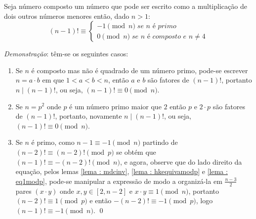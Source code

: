 \begin{teorema} \label{teorema : wilson}
    Seja número composto um número que pode ser escrito como a multiplicação de dois outros números menores então, dado $n > 1$:
    \begin{equation*}
        (n - 1)! \equiv \begin{cases}
                        -1 \pmod{n} \; \textit{se $n$ é primo} \\
                        0 \pmod{n} \; \textit{se $n$ é composto e $n \neq 4$}
                        \end{cases}
    \end{equation*}
\end{teorema}
\noindent
\textit{Demonstração}: têm-se os seguintes casos:
\begin{enumerate}
    \item Se $n$ é composto mas não é quadrado de um número primo, pode-se escrever $n = a \cdot b$ em que $1 < a < b < n$, então $a$ e $b$ são fatores de $(n-1)!$, portanto $n \mid (n-1)!$, ou seja, $(n-1)! \equiv 0 \pmod{n}$.

    \item Se $n = p^2$ onde $p$ é um número primo maior que $2$ então $p$ e $2 \cdot p$ são fatores de $(n-1)!$, portanto, novamente $n \mid (n-1)!$, ou seja, $(n-1)! \equiv 0 \pmod{n}$.

    \item \label{item:caso3wilson} Se $n$ é primo, como $n - 1 \equiv -1 \pmod{n}$ partindo de $(n-2)! \equiv (n-2)! \pmod{p}$ se obtém que $(n-1)! \equiv -(n-2)! \pmod{n}$, e agora, observe que do lado direito da equação, pelos lemas \ref{lema : mdcinv}, \ref{lema : hkequivamodp} e \ref{lema : eq1modp}, pode-se manipular a expressão de modo a organizá-la em $\frac{n-3}{2}$ pares $(x \cdot y)$ onde $x, y \in [2, n-2]$ e                      $x \cdot y \equiv 1 \pmod{n}$, portanto $(n-2)! \equiv 1 \pmod{p}$ e então $-(n-2)! \equiv -1 \pmod{p}$, logo $(n-1)! \equiv -1 \pmod{n}$.
\qed
\end{enumerate}

